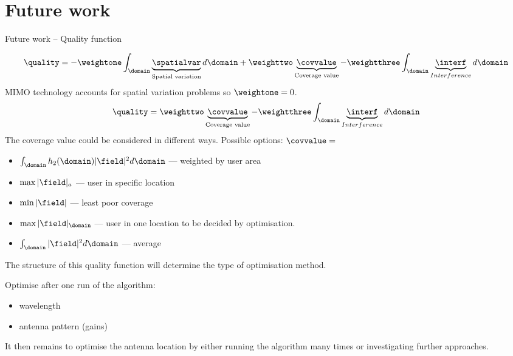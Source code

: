 \documentclass[8pt]{beamer}
\begin{document}
\section{Future work}
\begin{frame}{Future work -- Quality function}
\begin{block}{}
\begin{equation}
\quality=-\weightone \int_{\domain}\underbrace{ \spatialvar}_{\text{Spatial variation}}d\domain + \weighttwo\underbrace{ \covvalue}_{\text{Coverage value}} -\weightthree \int_{\domain}\underbrace{ \interf}_{Interference} d \domain
\end{equation}
MIMO technology accounts for spatial variation problems so $\weightone=0$.
\begin{equation}
\quality= \weighttwo\underbrace{ \covvalue}_{\text{Coverage value}} -\weightthree \int_{\domain}\underbrace{ \interf}_{Interference} d \domain
\end{equation}
The coverage value could be considered in different ways. Possible options: $\covvalue=$
\begin{multicols}{2}
\begin{itemize}
\item  $\int_{\domain} h_2(\domain)|\field|^2 d\domain$ --- weighted by user area
\item  $\max{|\field|_{a}}$ --- user in specific location
\item  $ \min{|\field|}$ --- least poor coverage
\item  $\max{|\field|_{\domain}}$ --- user in one location to be decided by optimisation.
\item $\int_{\domain} |\field|^2  d\domain $ --- average 
\end{itemize}
\end{multicols}
The structure of this quality function will determine the type of optimisation method.
\par Optimise after one run of the algorithm:
\begin{multicols}{2}
\begin{itemize}
\item wavelength
\item antenna pattern (gains)
\end{itemize}
\end{multicols}
It then remains to optimise the antenna location
by either running the algorithm many times or investigating further approaches.
\end{block}
\end{frame}
\end{document}
